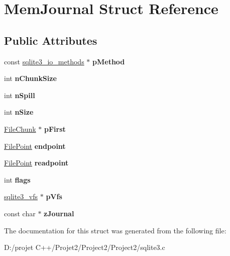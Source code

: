 \hypertarget{struct_mem_journal}{}\section{Mem\+Journal Struct Reference}
\label{struct_mem_journal}
\subsection*{Public Attributes}
\begin{DoxyCompactItemize}
\item 
\mbox{\label{struct_mem_journal_aad04f16d7faaeb548b3197cce7b0d37f}} 
const \mbox{\hyperlink{structsqlite3__io__methods}{sqlite3\+\_\+io\+\_\+methods}} $\ast$ {\bfseries p\+Method}
\item 
\mbox{\label{struct_mem_journal_a15ba0375c0a30b355f5f7594e8804c1a}} 
int {\bfseries n\+Chunk\+Size}
\item 
\mbox{\label{struct_mem_journal_afee076918f23dc1cd05681cb0504a77d}} 
int {\bfseries n\+Spill}
\item 
\mbox{\label{struct_mem_journal_a5c3de9e25d0e0a6fb36beec447de0c36}} 
int {\bfseries n\+Size}
\item 
\mbox{\label{struct_mem_journal_ade7a6dea7b38a8a86f33476ae207765f}} 
\mbox{\hyperlink{struct_file_chunk}{File\+Chunk}} $\ast$ {\bfseries p\+First}
\item 
\mbox{\label{struct_mem_journal_ac69637f95cfbce175cbeef00f71e59a9}} 
\mbox{\hyperlink{struct_file_point}{File\+Point}} {\bfseries endpoint}
\item 
\mbox{\label{struct_mem_journal_a5645d38e1a488b62b5f63112628bf472}} 
\mbox{\hyperlink{struct_file_point}{File\+Point}} {\bfseries readpoint}
\item 
\mbox{\label{struct_mem_journal_a1fcfbcbb9da77a5cefef038b1b846f35}} 
int {\bfseries flags}
\item 
\mbox{\label{struct_mem_journal_a5174aefb3d641db787fd1952e6e2fd7d}} 
\mbox{\hyperlink{structsqlite3__vfs}{sqlite3\+\_\+vfs}} $\ast$ {\bfseries p\+Vfs}
\item 
\mbox{\label{struct_mem_journal_a60e0eed44abd876329d1f7d9a4c0d773}} 
const char $\ast$ {\bfseries z\+Journal}
\end{DoxyCompactItemize}


The documentation for this struct was generated from the following file\+:\begin{DoxyCompactItemize}
\item 
D\+:/projet C++/\+Projet2/\+Project2/\+Project2/sqlite3.\+c\end{DoxyCompactItemize}
